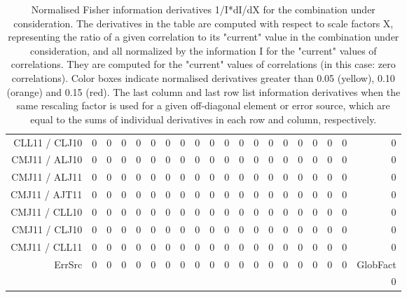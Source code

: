 \begin{table}[H]
\begin{center}
\begin{tabular}{|r|rrrrrrrrrrrrrrrrrr|r|}
CLL11 / CLJ10 &  0 &  0 &  0 &  0 &  0 &  0 &  0 &  0 &  0 &  0 &  0 &  0 &  0 &  0 &  0 &  0 &  0 &  0 &  0 \\
CMJ11 / ALJ10 &  0 &  0 &  0 &  0 &  0 &  0 &  0 &  0 &  0 &  0 &  0 &  0 &  0 &  0 &  0 &  0 &  0 &  0 &  0 \\
CMJ11 / ALJ11 &  0 &  0 &  0 &  0 &  0 &  0 &  0 &  0 &  0 &  0 &  0 &  0 &  0 &  0 &  0 &  0 &  0 &  0 &  0 \\
CMJ11 / AJT11 &  0 &  0 &  0 &  0 &  0 &  0 &  0 &  0 &  0 &  0 &  0 &  0 &  0 &  0 &  0 &  0 &  0 &  0 &  0 \\
CMJ11 / CLL10 &  0 &  0 &  0 &  0 &  0 &  0 &  0 &  0 &  0 &  0 &  0 &  0 &  0 &  0 &  0 &  0 &  0 &  0 &  0 \\
CMJ11 / CLJ10 &  0 &  0 &  0 &  0 &  0 &  0 &  0 &  0 &  0 &  0 &  0 &  0 &  0 &  0 &  0 &  0 &  0 &  0 &  0 \\
CMJ11 / CLL11 &  0 &  0 &  0 &  0 &  0 &  0 &  0 &  0 &  0 &  0 &  0 &  0 &  0 &  0 &  0 &  0 &  0 &  0 &  0 \\
\hline
\multirow{2}{*}{ErrSrc} & \multirow{2}{*}{ 0} & \multirow{2}{*}{ 0} & \multirow{2}{*}{ 0} & \multirow{2}{*}{ 0} & \multirow{2}{*}{ 0} & \multirow{2}{*}{ 0} & \multirow{2}{*}{ 0} & \multirow{2}{*}{ 0} & \multirow{2}{*}{ 0} & \multirow{2}{*}{ 0} & \multirow{2}{*}{ 0} & \multirow{2}{*}{ 0} & \multirow{2}{*}{ 0} & \multirow{2}{*}{ 0} & \multirow{2}{*}{ 0} & \multirow{2}{*}{ 0} & \multirow{2}{*}{ 0} & \multirow{2}{*}{ 0} & GlobFact\\
 & & & & & & & & & & & & & & & & & & &  0 \\
\hline
\end{tabular}
\renewcommand{\arraystretch}{1}
\caption{Normalised Fisher information derivatives 1/I*dI/dX for the combination under consideration. The derivatives in the table are computed with respect to scale factors X, representing the ratio of a given correlation to its "current" value in the combination under consideration, and all normalized by the information I for the "current" values of correlations. They are computed for the "current" values of correlations (in this case: zero correlations). Color boxes indicate normalised derivatives greater than 0.05 (yellow), 0.10 (orange) and 0.15 (red). The last column and last row list information derivatives when the same rescaling factor is used for a given off-diagonal element or error source, which are equal to the sums of individual derivatives in each row and column, respectively.}
\end{center}
\end{table}
